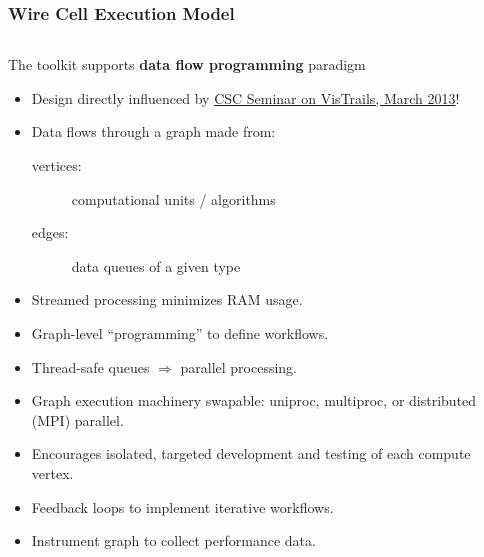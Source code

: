 \documentclass[xcolor=dvipsnames]{beamer}
\begin{document}
\begin{frame}[fragile]
  \frametitle{Wire Cell Execution Model}

  \begin{columns}
    \begin{column}{0.7\textwidth}
      \footnotesize 
      The toolkit supports \textbf{data flow programming} paradigm
      \begin{itemize}
        \item Design directly influenced by
          \href{http://www0.bnl.gov/events/details.php?q=8932}{CSC Seminar on VisTrails, March 2013}!
        \item Data flows through a graph made from:
          \begin{description}
          \item[vertices:] computational units / algorithms
          \item[edges:] data queues of a given type
          \end{description}
        \item Streamed processing minimizes RAM usage.
        \item Graph-level ``programming'' to define workflows.
        \item Thread-safe queues $\Rightarrow$ parallel processing.
        \item Graph execution machinery swapable: uniproc, multiproc, or
          distributed (MPI) parallel.
        \item Encourages isolated, targeted development and testing of each
          compute vertex.
        \item Feedback loops to implement iterative workflows.
        \item Instrument graph to collect performance data.
        \end{itemize}
      \end{column}
      \begin{column}{0.3\textwidth}

        \vspace{-10mm}


\end{column}
\end{columns}
\end{frame}
\end{document}
